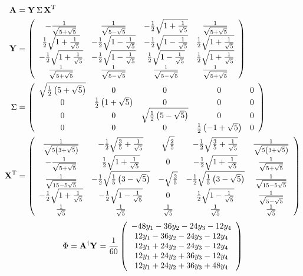 \documentclass[10pt]{article}
\begin{document}
\begin{equation}
\begin{split}
  \A{}&=\Y{}\,\Sigma\,\X{T} \\
\Y{}&=
\left(
\begin{array}{cccc}
 -\frac{1}{\sqrt{5+\sqrt{5}}} & \frac{1}{\sqrt{5-\sqrt{5}}} & -\frac{1}{2} \sqrt{1+\frac{1}{\sqrt{5}}} & \frac{1}{\sqrt{5+\sqrt{5}}} \\
 \frac{1}{2} \sqrt{1+\frac{1}{\sqrt{5}}} & -\frac{1}{2} \sqrt{1-\frac{1}{\sqrt{5}}} & -\frac{1}{2} \sqrt{1-\frac{1}{\sqrt{5}}} & \frac{1}{2} \sqrt{1+\frac{1}{\sqrt{5}}} \\
 -\frac{1}{2} \sqrt{1+\frac{1}{\sqrt{5}}} & -\frac{1}{2} \sqrt{1-\frac{1}{\sqrt{5}}} & \frac{1}{2} \sqrt{1-\frac{1}{\sqrt{5}}} & \frac{1}{2} \sqrt{1+\frac{1}{\sqrt{5}}} \\
 \frac{1}{\sqrt{5+\sqrt{5}}} & \frac{1}{\sqrt{5-\sqrt{5}}} & \frac{1}{\sqrt{5-\sqrt{5}}} & \frac{1}{\sqrt{5+\sqrt{5}}}
\end{array}
\right)\\
\Sigma&=
\left(
\begin{array}{ccccc}
 \sqrt{\frac{1}{2} \left(5+\sqrt{5}\right)} & 0 & 0 & 0 & 0 \\
 0 & \frac{1}{2} \left(1+\sqrt{5}\right) & 0 & 0 & 0 \\
 0 & 0 & \sqrt{\frac{1}{2} \left(5-\sqrt{5}\right)} & 0 & 0 \\
 0 & 0 & 0 & \frac{1}{2} \left(-1+\sqrt{5}\right) & 0
\end{array}
\right)\\
\X{T}&=
\left(
\begin{array}{ccccc}
 \frac{1}{\sqrt{5 \left(3+\sqrt{5}\right)}} & -\frac{1}{2} \sqrt{\frac{3}{5}+\frac{1}{\sqrt{5}}} & \sqrt{\frac{2}{5}} & -\frac{1}{2} \sqrt{\frac{3}{5}+\frac{1}{\sqrt{5}}} & \frac{1}{\sqrt{5 \left(3+\sqrt{5}\right)}} \\
 -\frac{1}{\sqrt{5+\sqrt{5}}} & \frac{1}{2} \sqrt{1+\frac{1}{\sqrt{5}}} & 0 & -\frac{1}{2} \sqrt{1+\frac{1}{\sqrt{5}}} & \frac{1}{\sqrt{5+\sqrt{5}}} \\
 \frac{1}{\sqrt{15-5 \sqrt{5}}} & -\frac{1}{2} \sqrt{\frac{1}{5} \left(3-\sqrt{5}\right)} & -\sqrt{\frac{2}{5}} & -\frac{1}{2} \sqrt{\frac{1}{5} \left(3-\sqrt{5}\right)} & \frac{1}{\sqrt{15-5 \sqrt{5}}} \\
 -\frac{1}{2} \sqrt{1+\frac{1}{\sqrt{5}}} & -\frac{1}{2} \sqrt{1-\frac{1}{\sqrt{5}}} & 0 & \frac{1}{2} \sqrt{1-\frac{1}{\sqrt{5}}} & \frac{1}{\sqrt{5-\sqrt{5}}} \\
 \frac{1}{\sqrt{5}} & \frac{1}{\sqrt{5}} & \frac{1}{\sqrt{5}} & \frac{1}{\sqrt{5}} & \frac{1}{\sqrt{5}}
\end{array}
\right)
\end{split}
\end{equation}
\begin{equation}
  \Phi=\A{\dagger}\Y{}=\frac{1}{60}
\mat{c}{-48 y_1-36 y_2-24 y_3-12 y_4\\12 y_1-36 y_2-24 y_3-12 y_4\\12 y_1+24 y_2-24 y_3-12 y_4\\12 y_1+24 y_2+36 y_3-12 y_4\\12 y_1+24 y_2+36 y_3+48 y_4
}
\end{equation}
\end{document}
